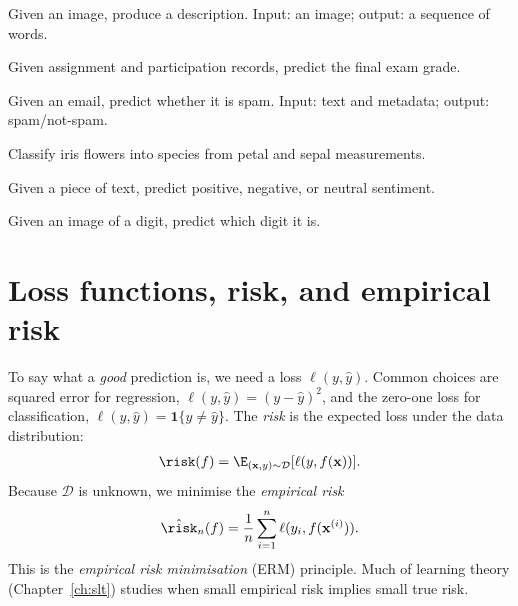 \documentclass[a4paper, 12pt]{book}
\begin{document}
\begin{example}
Given an image, produce a description. Input: an image; output: a sequence of words.
\end{example}

\begin{example}
Given assignment and participation records, predict the final exam grade.
\end{example}

\begin{example}
Given an email, predict whether it is spam. Input: text and metadata; output:
spam/not-spam.
\end{example}

\begin{example}
Classify iris flowers into species from petal and sepal measurements.
\end{example}

\begin{example}
Given a piece of text, predict positive, negative, or neutral sentiment.
\end{example}

\begin{example}
Given an image of a digit, predict which digit it is.
\end{example}

\section{Loss functions, risk, and empirical risk}

To say what a \emph{good} prediction is, we need a loss $\ell(y,\hat{y})$. Common
choices are squared error for regression, $\ell(y,\hat{y})=(y-\hat{y})^2$, and the
zero-one loss for classification, $\ell(y,\hat{y})=\mathbf{1}\{y \neq \hat{y}\}$.
The \emph{risk} is the expected loss under the data distribution:
\begin{align}
    \risk(f) = \E_{(\mathbf{x},y)\sim\mathcal{D}}[\ell(y,f(\mathbf{x}))].
\end{align}
Because $\mathcal{D}$ is unknown, we minimise the \emph{empirical risk}
\begin{align}
    \hat{\risk}_n(f) = \frac{1}{n}\sum_{i=1}^n \ell(y_i, f(\mathbf{x}^{(i)})).
\end{align}
This is the \emph{empirical risk minimisation} (ERM) principle. Much of learning
theory (Chapter~\ref{ch:slt}) studies when small empirical risk implies small true
risk.
\end{document}
